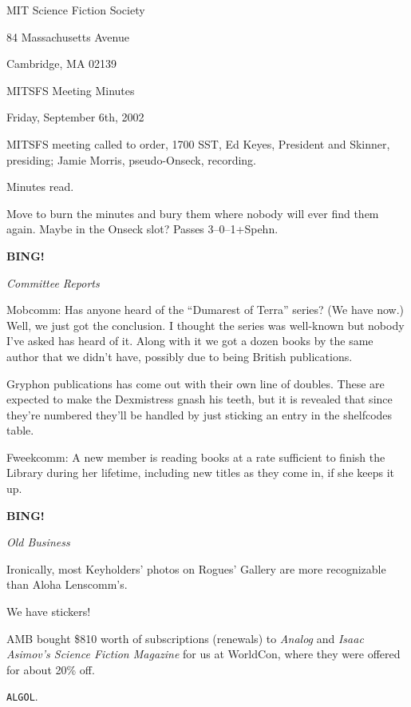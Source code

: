 \documentclass[12pt]{article}
\newcommand{\bing}{{\bf BING!} }
\newcommand{\goto}[1]{\bing \vskip 12pt \centerline{{\em{#1}}}}
\begin{document}
\begin{center}

MIT Science Fiction Society 

84 Massachusetts Avenue

Cambridge, MA 02139

\vspace{12pt}

MITSFS Meeting Minutes 

Friday, September 6th, 2002

\end{center}
 
\vspace{18pt}

\setlength{\parskip}{6pt}

\noindent
MITSFS meeting called to order, 1700 SST, Ed Keyes, President and
Skinner, presiding; Jamie Morris, pseudo-Onseck, recording.

Minutes read.

Move to burn the minutes and bury them where nobody will ever find them
again.  Maybe in the Onseck slot?  Passes 3--0--1+Spehn.

\goto{Committee Reports}

Mobcomm: Has anyone heard of the ``Dumarest of Terra'' series?  (We have now.)
Well, we just got the conclusion.  I thought the series was well-known but
nobody I've asked has heard of it.  Along with it we got a dozen books by
the same author that we didn't have, possibly due to being British 
publications.

Gryphon publications has come out with their own line of doubles.
These are expected to make the Dexmistress gnash his teeth, but it is
revealed that since they're numbered they'll be handled by just sticking
an entry in the shelfcodes table.

Fweekcomm: A new member is reading books at a rate sufficient to finish
the Library during her lifetime, including new titles as they come in,
if she keeps it up.

\goto{Old Business}

Ironically, most Keyholders' photos on Rogues' Gallery are more
recognizable than Aloha Lenscomm's.

We have stickers!

AMB bought \$810 worth of subscriptions (renewals) to \emph{Analog}
and \emph{Isaac Asimov's Science Fiction Magazine} for us at WorldCon,
where they were offered for about 20\% off.

\texttt{ALGOL}.
\end{document}
